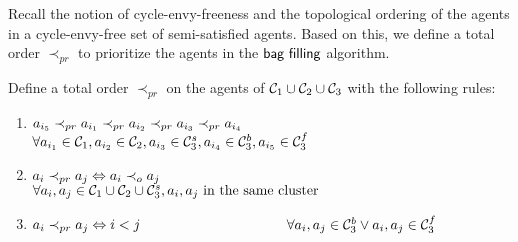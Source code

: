 Recall the notion of cycle-envy-freeness and the topological ordering of the agents in a cycle-envy-free set of semi-satisfied agents. Based on this, we define a total order $\prec_{pr}$ to prioritize the agents in the $\textsf{bag filling}$ algorithm. 

\begin{definition}
\label{priority}
Define a total order $\prec_{pr}$ on the agents of $\mathcal{C}_1 \cup \mathcal{C}_2 \cup \mathcal{C}_3$ with the following rules: 
\begin{minipage}[t]{\linegoal}
	
\begin{enumerate}[leftmargin=50pt]
    \item $a_{i_5} \prec_{pr} a_{i_1} \prec_{pr} a_{i_2} \prec_{pr} a_{i_3}  \prec_{pr} a_{i_4} \qquad$  $\forall a_{i_1} \in \mathcal{C}_1, a_{i_2} \in \mathcal{C}_2, a_{i_3} \in \mathcal{C}_3^s, a_{i_4} \in \mathcal{C}_3^b, a_{i_5} \in \mathcal{C}_3^f$
    \item $a_i \prec_{pr} a_j \Leftrightarrow a_i \prec_o a_j \hspace{85pt}$ $\forall a_i, a_j \in \mathcal{C}_1 \cup \mathcal{C}_2 \cup \mathcal{C}_3^s,  a_i ,a_j \mbox{ in the same cluster }$
	\item $\agent_i \prec_{pr} \agent_j \Leftrightarrow i < j \hspace{100pt}$ $\forall a_i,a_j \in \mathcal{C}_3^b \vee a_i,a_j \in \mathcal{C}_3^f$
\end{enumerate}
\end{minipage}
\end{definition}    

\begin{comment}
\begin{array}{cll}
(I)&\agent_{i_5} \prec_{pr} \agent_{i_1} \prec_{pr} \agent_{i_2} \prec_{pr} \agent_{i_3}  \prec_{pr} \agent_{i_4}& \forall \agent_{i_1} \in \cone, \agent_{i_2} \in \ctwo, \agent_{i_3} \in \cthree^s, \agent_{i_4} \in \cthree^b, \agent_{i_5} \in \cthree^f\\[6pt]
(II)&\agent_i \prec_{pr} \agent_j \Leftrightarrow \agent_i \prec_o \agent_j  & \forall \agent_i, \agent_j \in \cone \cup \ctwo \cup \cthree^s, \qquad \agent_i ,\agent_j \mbox{ in the same cluster }\\[6pt]

(III)&\agent_i \prec_{pr} \agent_j \Leftrightarrow i < j & \agent_i,\agent_j \in \cthree^b \vee \agent_i,\agent_j \in \cthree^f\\[6pt]
\end{array}.

\end{comment}



